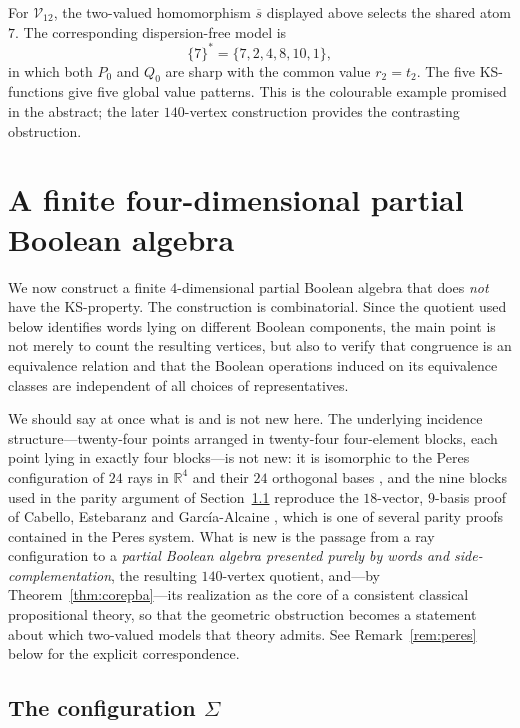 \documentclass{article}   	%
\theoremstyle{plain}
\theoremstyle{definition}
\theoremstyle{remark}
\begin{document}
For $\mathcal V_{12}$, the two-valued homomorphism $\overline s$ displayed above
selects the shared atom $7$.  The corresponding dispersion-free model is
\[
\{7\}^*=\{7,2,4,8,10,1\},
\]
in which both $P_0$ and $Q_0$ are sharp with the common value $r_2=t_2$.
The five KS-functions give five global value patterns.  This is the colourable
example promised in the abstract; the later $140$-vertex construction provides
the contrasting obstruction.


\section{A finite four-dimensional partial Boolean algebra}
\label{sec:4dim}

We now construct a finite $4$-dimensional partial Boolean algebra that does
\emph{not} have the KS-property.  The construction is combinatorial.  Since the
quotient used below identifies words lying on different Boolean components, the
main point is not merely to count the resulting vertices, but also to verify that
congruence is an equivalence relation and that the Boolean operations induced on
its equivalence classes are independent of all choices of representatives.

We should say at once what is and is not new here.  The underlying incidence
structure---twenty-four points arranged in twenty-four four-element blocks, each
point lying in exactly four blocks---is not new: it is isomorphic to the Peres
configuration of $24$ rays in $\mathbb R^{4}$ and their $24$ orthogonal bases
\cite{Peres1991}, and the nine blocks used in the parity argument of
Section~\ref{subsec:sigma} reproduce the $18$-vector, $9$-basis proof of Cabello,
Estebaranz and Garc\'ia-Alcaine \cite{Cabello1996}, which is one of several
parity proofs contained in the Peres system.  What is new is the passage from a
ray configuration to a \emph{partial Boolean algebra presented purely by words
and side-complementation}, the resulting $140$-vertex quotient, and---by
Theorem~\ref{thm:corepba}---its realization as the core of a consistent classical
propositional theory, so that the geometric obstruction becomes a statement about
which two-valued models that theory admits.  See
Remark~\ref{rem:peres} below for the explicit correspondence.

\subsection{The configuration $\Sigma$}
\label{subsec:sigma}
\end{document}
